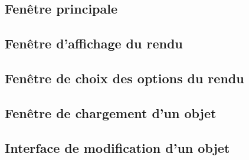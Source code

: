 \subsection{Fenêtre principale}
\subsection{Fenêtre d'affichage du rendu}
\subsection{Fenêtre de choix des options du rendu}
\subsection{Fenêtre de chargement d'un objet}
\subsection{Interface de modification d'un objet}
